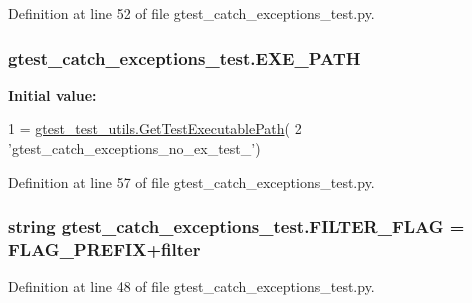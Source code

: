 Definition at line 52 of file gtest\+\_\+catch\+\_\+exceptions\+\_\+test.\+py.

\subsubsection[{\texorpdfstring{E\+X\+E\+\_\+\+P\+A\+TH}{EXE_PATH}}]{\setlength{\rightskip}{0pt plus 5cm}gtest\+\_\+catch\+\_\+exceptions\+\_\+test.\+E\+X\+E\+\_\+\+P\+A\+TH}\hypertarget{namespacegtest__catch__exceptions__test_a164e7815d55b13a811ce60e2e6f9448d}{}\label{namespacegtest__catch__exceptions__test_a164e7815d55b13a811ce60e2e6f9448d}
{\bfseries Initial value\+:}
\begin{DoxyCode}
1 = \hyperlink{namespacegtest__test__utils_a89ed3717984a80ffbb7a9c92f71b86a2}{gtest\_test\_utils.GetTestExecutablePath}(
2     \textcolor{stringliteral}{'gtest\_catch\_exceptions\_no\_ex\_test\_'})
\end{DoxyCode}


Definition at line 57 of file gtest\+\_\+catch\+\_\+exceptions\+\_\+test.\+py.

\subsubsection[{\texorpdfstring{F\+I\+L\+T\+E\+R\+\_\+\+F\+L\+AG}{FILTER_FLAG}}]{\setlength{\rightskip}{0pt plus 5cm}string gtest\+\_\+catch\+\_\+exceptions\+\_\+test.\+F\+I\+L\+T\+E\+R\+\_\+\+F\+L\+AG = {\bf F\+L\+A\+G\+\_\+\+P\+R\+E\+F\+IX}+\textquotesingle{}filter\textquotesingle{}}\hypertarget{namespacegtest__catch__exceptions__test_a1a53cfa4c10fe3bdbc85a14fd9692751}{}\label{namespacegtest__catch__exceptions__test_a1a53cfa4c10fe3bdbc85a14fd9692751}


Definition at line 48 of file gtest\+\_\+catch\+\_\+exceptions\+\_\+test.\+py.

